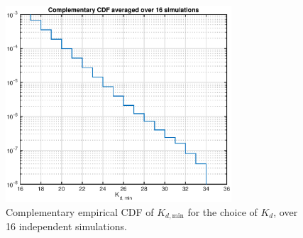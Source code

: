 \documentclass[10pt]{article}
\begin{document}
\begin{figure}
 \centering
 \includegraphics[width = 0.75\textwidth]{Kd_min_estimation}
 \caption{Complementary empirical CDF of $K_{d,\mathrm{min}}$ for the choice of $K_d$, over 16 independent simulations.}
 \label{fig:Kd_min_estimation}
\end{figure}


\end{document}
